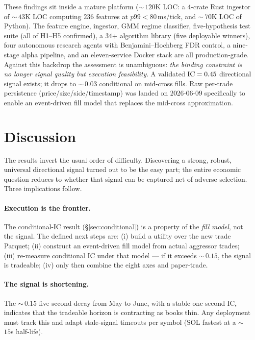 \documentclass[11pt]{article}
\newcommand{\code}[1]{\texttt{\detokenize{#1}}}
\newcommand{\ic}{\textnormal{IC}}
\begin{document}
These findings sit inside a mature platform ($\sim$\,$120$K LOC: a $4$-crate Rust ingestor
of $\sim$\,$43$K LOC computing $236$ features at $p99 < 80\,$ms/tick, and $\sim$\,$70$K LOC
of Python). The feature engine, ingestor, GMM regime classifier, five-hypothesis test
suite (all of H1--H5 confirmed), a $34$+ algorithm library (five deployable winners), four
autonomous research agents with Benjamini--Hochberg FDR control, a nine-stage alpha
pipeline, and an eleven-service Docker stack are all production-grade. Against this
backdrop the assessment is unambiguous: \emph{the binding constraint is no longer signal
quality but execution feasibility}. A validated $\ic = 0.45$ directional signal exists; it
drops to $\sim$\,$0.03$ conditional on mid-cross fills. Raw per-trade persistence
(price/size/side/timestamp) was landed on 2026-06-09 specifically to enable an
event-driven fill model that replaces the mid-cross approximation.

\section{Discussion}\label{sec:discussion}

The results invert the usual order of difficulty. Discovering a strong, robust, universal
directional signal turned out to be the easy part; the entire economic question reduces to
whether that signal can be captured net of adverse selection. Three implications follow.

\paragraph{Execution is the frontier.} The conditional-\ic{} result
(\S\ref{sec:conditional}) is a property of the \emph{fill model}, not the signal. The
defined next steps are: (i) build a \code{load_trades()} utility over the new trade
Parquet; (ii) construct an event-driven fill model from actual aggressor trades; (iii)
re-measure conditional \ic{} under that model --- if it exceeds $\sim$\,$0.15$, the signal
is tradeable; (iv) only then combine the eight axes and paper-trade.

\paragraph{The signal is shortening.} The $\sim$\,$0.15$ five-second decay from May to June,
with a stable one-second \ic, indicates that the tradeable horizon is contracting as books
thin. Any deployment must track this and adapt stale-signal timeouts per symbol (SOL fastest
at a $\sim$\,$15$s half-life).
\end{document}

